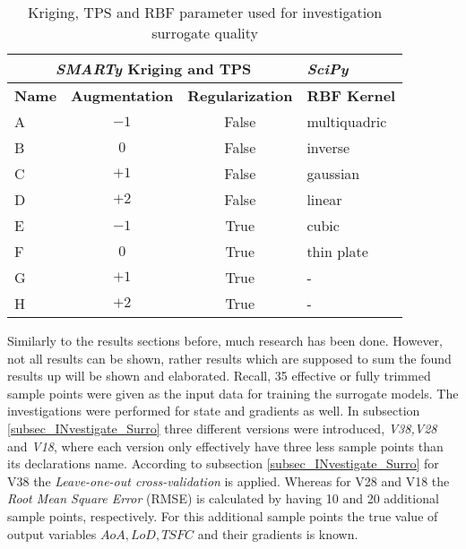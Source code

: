 %
\begin{table}[!h]
        \centering
        \begin{tabular}{l c c |l }
            \multicolumn{3}{c|}{\textbf{\emph{SMARTy} 
            Kriging and TPS}} & 
            \multicolumn{1}{l}{\textbf{\emph{SciPy}}} \\
            \hline
            \multicolumn{1}{l}{\textbf{Name}} & 
            \multicolumn{1}{c}{\textbf{Augmentation}} &
            \multicolumn{1}{c}{\textbf{Regularization}} &
            \multicolumn{1}{|c}{\textbf{RBF Kernel}}\\
            \hline
            A & $-1$ &False &  multiquadric       \\
            B & $0$ &False  & inverse      \\
            C & $+1$ &False &  gaussian        \\
            D & $+2$ &False &  linear       \\
            E & $-1$ &True  &  cubic   \\
            F & $0$ &True   &  thin plate   \\
            G & $+1$ &True  &   -  \\
            H & $+2$ &True  &  -   \\
        \end{tabular}
        \caption{Kriging, TPS and RBF parameter used for investigation 
        surrogate quality}
        \label{tab_7}
\end{table} 
%
\FloatBarrier
Similarly to the results sections before, much 
research has been done. However, not 
all results can be shown, rather 
results which are supposed to sum the 
found results up will be shown and elaborated.
Recall, 35 effective or fully trimmed sample points 
were given as the input data for training the surrogate 
models. The investigations were performed 
for state and gradients as well. In 
subsection \ref{subsec_INvestigate_Surro} 
three different versions were introduced, \emph{V38,V28}
and \emph{V18}, where each version only effectively
have three less sample points than its declarations name.
According to subsection 
\ref{subsec_INvestigate_Surro} for V38 the
\emph{Leave-one-out cross-validation} is applied. Whereas 
for V28 and V18 the \emph{Root Mean Square Error} (RMSE)
is calculated by having 10 and 20 additional 
sample points, respectively. For
this additional sample points the true value of output variables 
$AoA, LoD, TSFC$ and their gradients is known.\newline


